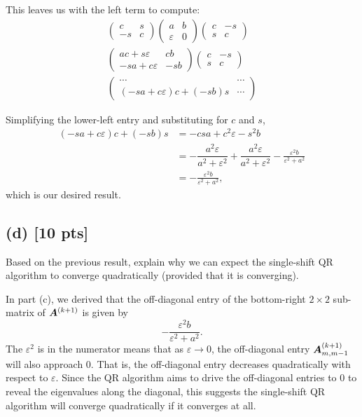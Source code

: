 \documentclass[twoside,10pt]{article}
\begin{document}
This leaves us with the left term to compute:
\begin{align*}
\begin{pmatrix}
  c & s \\
  -s & c
\end{pmatrix}
\begin{pmatrix}
  a & b \\
  \varepsilon & 0
\end{pmatrix}
\begin{pmatrix}
  c & -s \\
  s & c
\end{pmatrix}\\
\begin{pmatrix}
  ac + s\varepsilon & cb \\
  -sa + c\varepsilon & -sb
\end{pmatrix}
\begin{pmatrix}
  c & -s \\
  s & c
\end{pmatrix}\\
\begin{pmatrix}
  \cdots & \cdots \\
  (-sa + c\varepsilon)c + (-sb)s & \cdots
\end{pmatrix}
\end{align*}

Simplifying the lower-left entry and substituting for $c$ and $s$,
\begin{align*}
(-sa + c\varepsilon)c + (-sb)s &= -csa + c^2\varepsilon - s^2b\\
&= -\dfrac{a^2\varepsilon}{a^2 + \varepsilon^2} + \dfrac{a^2\varepsilon}{a^2 + \varepsilon^2} - \frac{\varepsilon^2 b}{\varepsilon^2 + a^2}\\
&= - \frac{\varepsilon^2 b}{\varepsilon^2 + a^2},
\end{align*}
which is our desired result.

  \subsection*{(d) [10 pts]} 
  Based on the previous result, explain why we can expect the single-shift QR algorithm to converge quadratically (provided that it is converging). 

  \quad In part (c), we derived that the off-diagonal entry of the bottom-right $2 \times 2$ sub-matrix of $\bm{A}^{(k+1)}$ is given by
  $$-\frac{\varepsilon^2 b}{\varepsilon^2 + a^2}.$$
  The $\varepsilon^2$ is in the numerator means that as $\varepsilon \to 0$, the off-diagonal entry $\bm{A}_{m, m-1}^{(k + 1)}$ will also approach $0$.
  That is, the off-diagonal entry decreases quadratically with respect to $\varepsilon$.
  Since the QR algorithm aims to drive the off-diagonal entries to $0$ to reveal the eigenvalues along the diagonal, this suggests the single-shift QR algorithm will converge quadratically if it converges at all.
\end{document}
